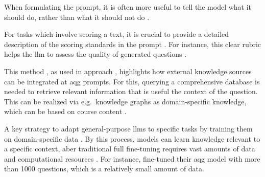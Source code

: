  When formulating the prompt, it is often more useful to tell the model what it should do, rather than what it should not do \cite{zhao_survey_2025}. 

 For tasks which involve scoring a text, it is crucial to provide a detailed description of the scoring standards in the prompt \cite{zhao_survey_2025}. For instance, this clear rubric helps the \ac{llm} to assess the quality of generated questions \cite{scaria_automated_2024}.



 This method \cite{lewis_retrieval-augmented_2020}, as used in approach \cite{hang_mcqgen_2024}, highlights how external knowledge sources can be integrated at \ac{aqg} prompts. For this, querying a comprehensive database is needed to retrieve relevant information that is useful the context of the question. This can be realized via e.g.\ knowledge graphs as domain-specific knowledge, which can be based on course content \cite{yang_heuristic_2024}.

 A key strategy to adapt general-purpose \ac{llms} to specific tasks by training them on domain-specific data \cite{hou_large_2024}. By this process, models can learn knowledge relevant to a specific context, aber traditional full fine-tuning requires vast amounts of data and computational resources \cite{hou_large_2024}. For instance, \cite{duong-trung_bloomllm_2024} fine-tuned their \ac{aqg} model with more than 1000 questions, which is a relatively small amount of data. %

